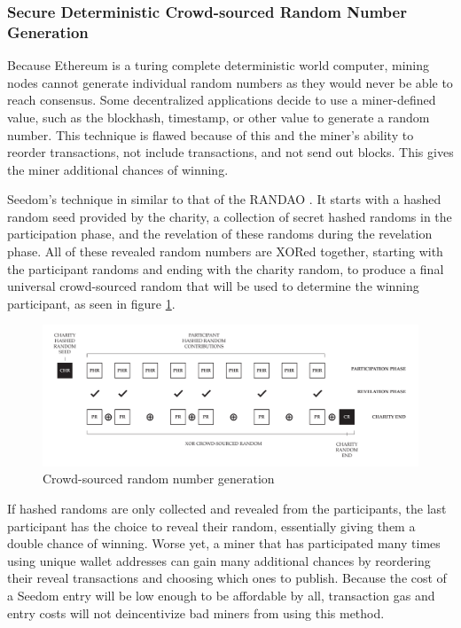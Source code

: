\documentclass[11pt]{article}
\begin{document}
\subsubsection{Secure Deterministic Crowd-sourced Random Number Generation}

Because Ethereum is a turing complete deterministic world computer, mining nodes cannot generate individual random numbers as they would never be able to reach consensus. Some decentralized applications decide to use a miner-defined value, such as the blockhash, timestamp, or other value to generate a random number. This technique is flawed because of this and the miner's ability to reorder transactions, not include transactions, and not send out blocks. This gives the miner additional chances of winning.

Seedom's technique in similar to that of the RANDAO \cite{2}. It starts with a hashed random seed provided by the charity, a collection of secret hashed randoms in the participation phase, and the revelation of these randoms during the revelation phase. All of these revealed random numbers are XORed together, starting with the participant randoms and ending with the charity random, to produce a final universal crowd-sourced random that will be used to determine the winning participant, as seen in figure \ref{figure:crowdsourcedRandomNumberGeneration}.

\begin{figure}[H]
\begin{center}
\includegraphics[width=1.0\textwidth]{crowdsourcedRandomNumberGeneration.pdf}
\caption{Crowd-sourced random number generation}
\label{figure:crowdsourcedRandomNumberGeneration}
\end{center}
\end{figure}

If hashed randoms are only collected and revealed from the participants, the last participant has the choice to reveal their random, essentially giving them a double chance of winning. Worse yet, a miner that has participated many times using unique wallet addresses can gain many additional chances by reordering their reveal transactions and choosing which ones to publish. Because the cost of a Seedom entry will be low enough to be affordable by all, transaction gas and entry costs will not deincentivize bad miners from using this method.
\end{document}
